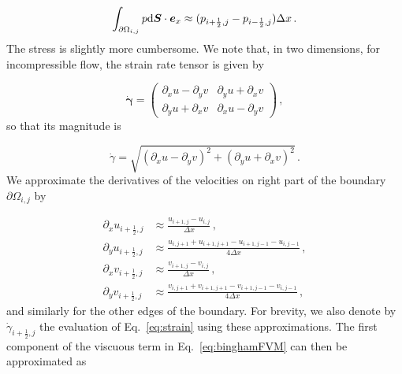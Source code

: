 \documentclass[final,3p,twocolumn]{elsarticle}
\begin{document}
\begin{equation}
    \int_{\partial \Omega_{i,j}} p {\rm d}\bm{S} \cdot \bm{e}_x \approx
    (p_{i+\frac{1}{2},j}-p_{i-\frac{1}{2},j}) \Delta x \,.
\end{equation}
%
The stress is slightly more cumbersome. We note that, in two dimensions, for
incompressible flow, the strain rate tensor is given by 

\begin{equation}
    \dot{\bm{\gamma}} = 
    \begin{pmatrix}
        \partial_x u - \partial_y v & \partial_y u + \partial_x v \\
        \partial_y u + \partial_x v & \partial_x u - \partial_y v
    \end{pmatrix} \,,
\end{equation}
%
so that its magnitude is 

\begin{equation}
    \dot{\gamma} = \sqrt{(\partial_x u - \partial_y v)^2+(\partial_y u +
    \partial_x v)^2} \,.
    \label{eq:strain}
\end{equation}
%
We approximate the derivatives of the velocities on right part of the boundary $\partial
\Omega_{i,j}$ by 

\begin{align}
    \nonumber 
    \partial_x u_{i+\frac{1}{2},j} &\approx \frac{u_{i+1,j}-u_{i,j}}{\Delta x}
    \,, \\
    \nonumber 
    \partial_y u_{i+\frac{1}{2},j} &\approx
    \frac{u_{i,j+1}+u_{i+1,j+1}-u_{i+1,j-1}-u_{i,j-1}}{4\Delta x} \,, \\
    \nonumber
    \partial_x v_{i+\frac{1}{2},j} &\approx \frac{v_{i+1,j}-v_{i,j}}{\Delta x}
    \,, \\
    \partial_y v_{i+\frac{1}{2},j} &\approx
    \frac{v_{i,j+1}+v_{i+1,j+1}-v_{i+1,j-1}-v_{i,j-1}}{4\Delta x} \,,
\end{align}
%
and similarly for the other edges of the boundary. For brevity, we also denote
by $\dot{\gamma}_{i+\frac{1}{2},j}$ the evaluation of Eq.\ \eqref{eq:strain}
using these approximations. The first component of the viscuous term in Eq.\
\eqref{eq:binghamFVM} can then be approximated as
\end{document}
